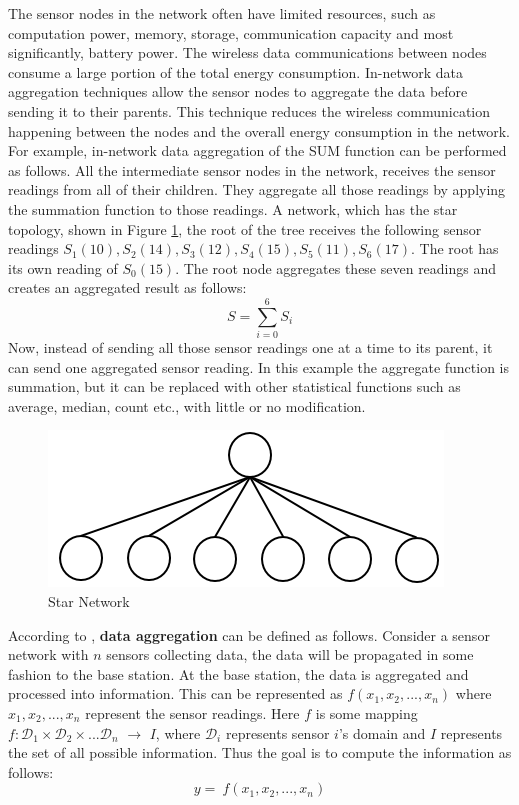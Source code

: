 	The sensor nodes in the network often have limited resources, such as computation power, memory, storage, communication capacity and most significantly, battery power.
	The wireless data communications between nodes consume a large portion of the total energy consumption. 
	In-network data aggregation techniques allow the sensor nodes to aggregate the data before sending it to their parents.
	This technique reduces the wireless communication happening between the nodes and the overall energy consumption in the network. 	
	For example, in-network data aggregation of the SUM function can be performed as follows.
	All the intermediate sensor nodes in the network, receives the sensor readings from all of their children.
	They aggregate all those readings by applying the summation function to those readings.
	A network, which has the star topology, shown in Figure \ref{fig:star-network}, the root of the tree receives the following sensor readings $S_{1}(10),S_{2}(14),S_{3}(12),S_{4}(15),S_{5}(11),S_{6}(17)$.
	The root has its own reading of $S_{0}(15)$. 
	The root node aggregates these seven readings and creates an aggregated result as follows:
	\begin{equation}
		S = \sum_{i=0}^6 S_{i}
	\end{equation}
	Now, instead of sending all those sensor readings one at a time to its parent, it can send one aggregated sensor reading.
	In this example the aggregate function is summation, but it can be replaced with other statistical functions such as average, median, count etc., with little or no modification.
	\begin{figure}[h!]
		\centering
		\includegraphics[scale = 1]{images/star-tree.png}
		\caption{Star Network}
		\label{fig:star-network}
	\end{figure}

	According to \cite{zareafifi2012secure}, \textbf{data aggregation} can be defined as follows.
	Consider a sensor network with $n$ sensors collecting data, the data will be propagated in some fashion to the base station.
	At the base station, the data is aggregated and processed into information. 
	This can be represented as
		$f(x_{1}, x_{2},...,x_{n})$
	where $x_{1}, x_{2},..., x_{n}$ represent the sensor readings.
	Here $f$ is some mapping $f: \mathcal{D}_{1} \times \mathcal{D}_{2} \times ... \mathcal{D}_{n}$ $\rightarrow$ $I$, where $\mathcal{D}_{i}$ represents sensor $i$'s domain and $I$ represents the set of all possible information. 
	Thus the goal is to compute the information as follows:
	\begin{equation}
		\label{eq:aggregation}
		y =\ f(x_{1}, x_{2},...,x_{n})
	\end{equation}

